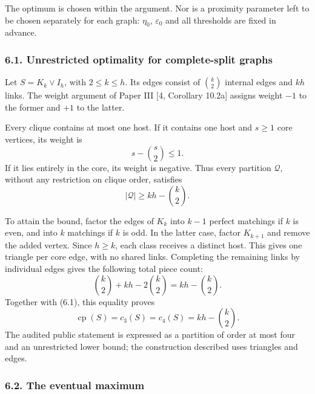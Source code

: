 \documentclass[english,11pt,a4paper]{article}
\begin{document}
The optimum is chosen within the argument. Nor is a proximity parameter left to be chosen separately for each graph: \(\eta_0\), \(\varepsilon_0\) and all thresholds are fixed in advance.

\subsubsection{6.1. Unrestricted optimality for complete-split graphs}\label{unrestricted-optimality-for-complete-split-graphs}

Let \(S=K_k\vee I_h\), with \(2\le k\le h\). Its edges consist of \(\binom k2\) internal edges and \(kh\) links. The weight argument of Paper III {[}4, Corollary 10.2a{]} assigns weight \(-1\) to the former and \(+1\) to the latter.

Every clique contains at most one host. If it contains one host and \(s\ge1\) core vertices, its weight is \[
s-\binom s2\le1.
\] If it lies entirely in the core, its weight is negative. Thus every partition \(\mathcal Q\), without any restriction on clique order, satisfies \[
|\mathcal Q|\ge kh-\binom k2.
\tag{6.1}
\]

To attain the bound, factor the edges of \(K_k\) into \(k-1\) perfect matchings if \(k\) is even, and into \(k\) matchings if \(k\) is odd. In the latter case, factor \(K_{k+1}\) and remove the added vertex. Since \(h\ge k\), each class receives a distinct host. This gives one triangle per core edge, with no shared links. Completing the remaining links by individual edges gives the following total piece count: \[
\binom k2+kh-2\binom k2=kh-\binom k2.
\] Together with (6.1), this equality proves \[
\operatorname{cp}(S)=c_3(S)=c_4(S)=kh-\binom k2.
\tag{6.2}
\] The audited public statement is expressed as a partition of order at most four and an unrestricted lower bound; the construction described uses triangles and edges.

\subsubsection{6.2. The eventual maximum}\label{the-eventual-maximum}
\end{document}
